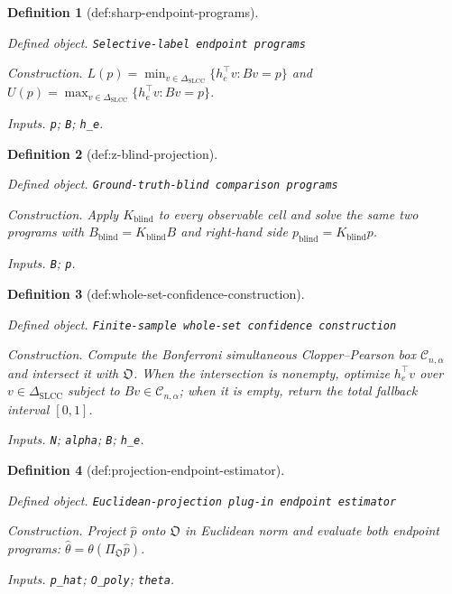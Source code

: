 \documentclass{article}
\newtheorem{definition}{Definition}
\begin{document}
\begin{definition}[def:sharp-endpoint-programs]\label{def:sharp-endpoint-programs}
\par\smallskip\noindent\emph{Defined object.} \texttt{Selective-\allowbreak{}label endpoint programs}
\par\smallskip\noindent\emph{Construction.} \(L(p)=\min_{v\in\Delta_{\mathrm{SLCC}}}\{h_e^{\top}v:Bv=p\}\) and \(U(p)=\max_{v\in\Delta_{\mathrm{SLCC}}}\{h_e^{\top}v:Bv=p\}\).
\par\smallskip\noindent\emph{Inputs.} \texttt{p}; \texttt{B}; \texttt{h\_\allowbreak{}e}.
\end{definition}

\begin{definition}[def:z-blind-projection]\label{def:z-blind-projection}
\par\smallskip\noindent\emph{Defined object.} \texttt{Ground-\allowbreak{}truth-\allowbreak{}blind comparison programs}
\par\smallskip\noindent\emph{Construction.} Apply \(K_{\mathrm{blind}}\) to every observable cell and solve the same two programs with \(B_{\mathrm{blind}}=K_{\mathrm{blind}}B\) and right-hand side \(p_{\mathrm{blind}}=K_{\mathrm{blind}}p\).
\par\smallskip\noindent\emph{Inputs.} \texttt{B}; \texttt{p}.
\end{definition}

\begin{definition}[def:whole-set-confidence-construction]\label{def:whole-set-confidence-construction}
\par\smallskip\noindent\emph{Defined object.} \texttt{Finite-\allowbreak{}sample whole-\allowbreak{}set confidence construction}
\par\smallskip\noindent\emph{Construction.} Compute the Bonferroni simultaneous Clopper--Pearson box \(\mathcal C_{n,\alpha}\) and intersect it with \(\mathfrak O\). When the intersection is nonempty, optimize \(h_e^{\top}v\) over \(v\in\Delta_{\mathrm{SLCC}}\) subject to \(Bv\in\mathcal C_{n,\alpha}\); when it is empty, return the total fallback interval \([0,1]\).
\par\smallskip\noindent\emph{Inputs.} \texttt{N}; \texttt{alpha}; \texttt{B}; \texttt{h\_\allowbreak{}e}.
\end{definition}

\begin{definition}[def:projection-endpoint-estimator]\label{def:projection-endpoint-estimator}
\par\smallskip\noindent\emph{Defined object.} \texttt{Euclidean-\allowbreak{}projection plug-\allowbreak{}in endpoint estimator}
\par\smallskip\noindent\emph{Construction.} Project \(\widehat p\) onto \(\mathfrak O\) in Euclidean norm and evaluate both endpoint programs: \(\widehat\theta=\theta(\Pi_{\mathfrak O}\widehat p)\).
\par\smallskip\noindent\emph{Inputs.} \texttt{p\_\allowbreak{}hat}; \texttt{O\_\allowbreak{}poly}; \texttt{theta}.
\end{definition}
\end{document}
